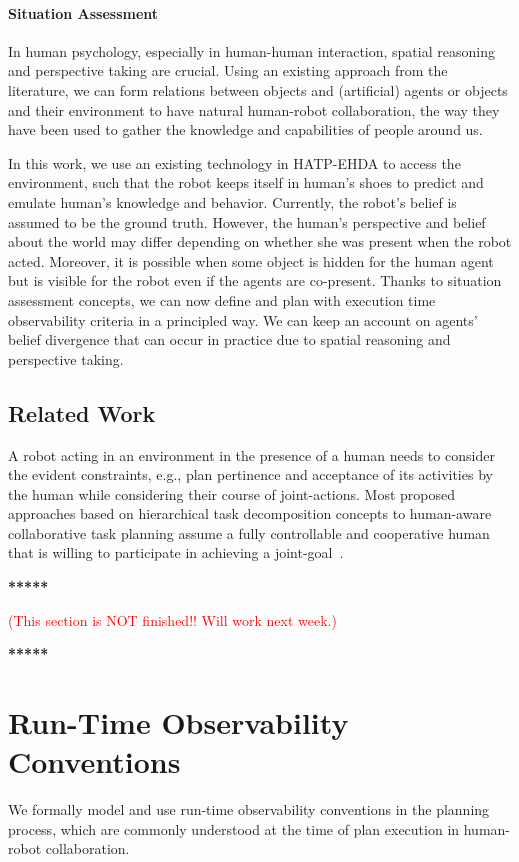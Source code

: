 \documentclass[letterpaper]{article} %
\begin{document}
\paragraph{Situation Assessment} In human psychology, especially in human-human interaction, spatial reasoning and perspective taking are crucial. 
Using an existing approach from the literature, we can form relations between objects and (artificial) agents or objects and their environment to have natural human-robot collaboration, the way they have been used to gather the knowledge and capabilities of people around us. 

In this work, we use an existing technology in HATP-EHDA to access the environment, such that the robot keeps itself in human's shoes to predict and emulate human's knowledge and behavior. 
Currently, the robot's belief is assumed to be the ground truth. However, the human's perspective and belief about the world may differ depending on whether she was present when the robot acted. 
Moreover, it is possible when some object is hidden for the human agent but is visible for the robot even if the agents are co-present. 
Thanks to situation assessment concepts, we can now define and plan with execution time observability criteria in a principled way. 
We can keep an account on agents' belief divergence that can occur in practice due to spatial reasoning and perspective taking. 

\subsection{Related Work}
A robot acting in an environment in the presence of a human needs to consider the evident constraints, e.g., plan pertinence and acceptance of its activities by the human while considering their course of joint-actions.
Most proposed approaches based on hierarchical task decomposition concepts to human-aware collaborative task planning assume a fully controllable and cooperative human that is willing to participate in achieving a joint-goal~\cite{sebastiani2017dealing,alami2006toward,lallement2014hatp,lallement2018hatp}.

\textbf{*****}

\textcolor{red}{(This section is NOT finished!! Will work next week.)}

\textbf{*****}

\section{Run-Time Observability Conventions}
We formally model and use run-time observability conventions in the planning process, which are commonly understood at the time of plan execution in human-robot collaboration. 
\end{document}
